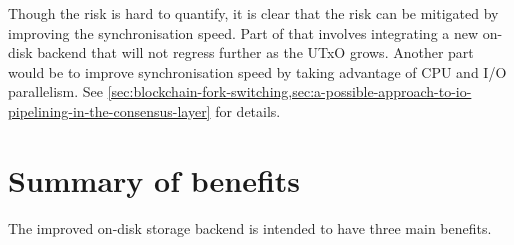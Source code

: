 \documentclass[11pt,a4paper]{article}
\begin{document}
\begin{itemize}
      Though the risk is hard to quantify, it is clear that the risk can be
      mitigated by improving the synchronisation speed. Part of that involves
      integrating a new on-disk backend that will not regress further as the
      UTxO grows. Another part would be to improve synchronisation speed by
      taking advantage of CPU and I/O parallelism. See
      \cref{sec:blockchain-fork-switching,sec:a-possible-approach-to-io-pipelining-in-the-consensus-layer}
      for details.

\end{itemize}

\section{Summary of benefits}

The improved on-disk storage backend is intended to have three main benefits.
\end{document}

